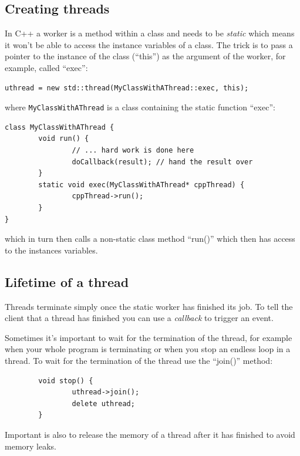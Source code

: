 \documentclass[12pt]{report}
\begin{document}
\subsection{Creating threads}
In C++ a worker is a method within
a class and needs to be \textsl{static} which means it won't be
able to access the instance variables of a class. The trick
is to pass a pointer to the instance of the class (``this'') as the argument of
the worker, for example, called ``exec'':
\begin{verbatim}
uthread = new std::thread(MyClassWithAThread::exec, this);
\end{verbatim}
where \texttt{MyClassWithAThread} is a class containing the static function ``exec'':
\begin{verbatim}
class MyClassWithAThread {
        void run() {
                // ... hard work is done here
                doCallback(result); // hand the result over
        }
        static void exec(MyClassWithAThread* cppThread) {
                cppThread->run();
        }
}
\end{verbatim}
which in turn then calls a non-static class method ``run()'' which
then has access to the instances variables.



\subsection{Lifetime of a thread}
Threads terminate simply once the static worker has finished its job.
To tell the client that a thread has finished you can use a
\textsl{callback} to trigger an event.

Sometimes it's important to wait for the termination of the thread,
for example when your whole program is terminating or when
you stop an endless loop in a thread. To wait for the termination
of the thread use the ``join()'' method:
\begin{verbatim}
        void stop() {
                uthread->join();
                delete uthread;
        }
\end{verbatim}
Important is also to release the memory of a thread after it has finished
to avoid memory leaks.
\end{document}
